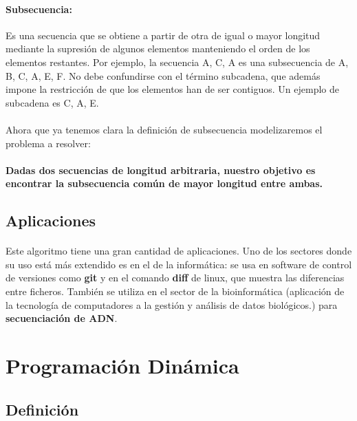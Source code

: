 \documentclass{article}
\begin{document}
		\paragraph{Subsecuencia:}
		Es una secuencia que se obtiene a partir de otra de igual o mayor longitud mediante la supresión de algunos elementos manteniendo el orden de los elementos restantes. Por ejemplo, la secuencia A, C, A es una subsecuencia de A, B, C, A, E, F.
		\newline
		No debe confundirse con el término subcadena, que además impone la restricción de que los elementos han de ser contiguos. Un ejemplo de subcadena es  C, A, E.

		\paragraph{}
		Ahora que ya tenemos clara la definición de subsecuencia modelizaremos el problema a resolver:
		
		\paragraph{}
		\textbf{Dadas dos secuencias de longitud arbitraria, nuestro objetivo es encontrar la subsecuencia común de mayor longitud entre ambas.}

	\subsection{Aplicaciones}
	
		\paragraph{}
		Este algoritmo tiene una gran cantidad de aplicaciones. Uno de los sectores donde su uso está más extendido es en el de la informática: se usa en software de control de versiones como \textbf{git} y en el comando \textbf{diff} de linux, que muestra las diferencias entre ficheros. También se utiliza en el sector de la bioinformática (aplicación de la tecnología de computadores a la gestión y análisis de datos biológicos.) para \textbf{secuenciación de ADN}.

\section{Programación Dinámica}

	\subsection{Definición}
	
\end{document}
